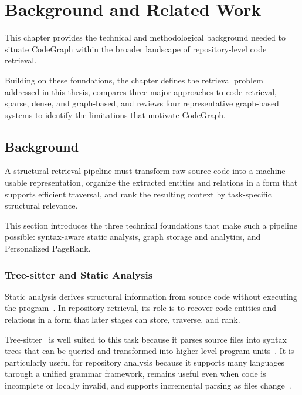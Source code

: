 \chapter{Background and Related Work}
\label{ch:background}

This chapter provides the technical and methodological background needed to situate CodeGraph within the broader landscape of repository-level code retrieval.

Building on these foundations, the chapter defines the retrieval problem addressed in this thesis, compares three major approaches to code retrieval, sparse, dense, and graph-based, and reviews four representative graph-based systems to identify the limitations that motivate CodeGraph.

\section{Background}
\label{sec:background}

A structural retrieval pipeline must transform raw source code into a machine-usable representation, organize the extracted entities and relations in a form that supports efficient traversal, and rank the resulting context by task-specific structural relevance.

This section introduces the three technical foundations that make such a pipeline possible: syntax-aware static analysis, graph storage and analytics, and Personalized PageRank.

\subsection{Tree-sitter and Static Analysis}
\label{sec:treesitter-bg}

Static analysis derives structural information from source code without executing the program~\cite{cousot1996abstract}. In repository retrieval, its role is to recover code entities and relations in a form that later stages can store, traverse, and rank.

Tree-sitter~\cite{treesitter} is well suited to this task because it parses source files into syntax trees that can be queried and transformed into higher-level program units~\cite{comex2023}. It is particularly useful for repository analysis because it supports many languages through a unified grammar framework, remains useful even when code is incomplete or locally invalid, and supports incremental parsing as files change~\cite{treesitterdocs}.

